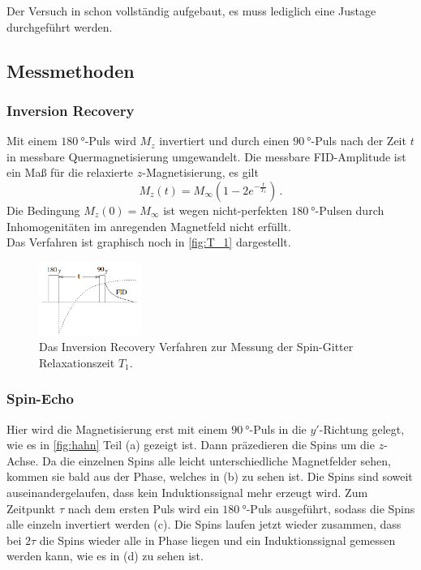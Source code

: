         \noindent Der Versuch in schon vollständig aufgebaut, es muss lediglich eine Justage durchgeführt werden. 

    \subsection{Messmethoden}
    \label{sec:Messmethoden}

    \subsubsection{Inversion Recovery}

        Mit einem $\SI{180}{\degree}$-Puls wird $M_z$ invertiert und durch einen $\SI{90}{\degree}$-Puls nach der Zeit $t$ 
        in messbare Quermagnetisierung umgewandelt. Die messbare FID-Amplitude ist ein Maß für die relaxierte $z$-Magnetisierung, es gilt 
        \begin{equation*}
            M_z(t) = M_\infty \left(1 - 2e^{-\frac{t}{T_1}}\right)\, .
        \end{equation*}
        Die Bedingung $M_z(0) = M_\infty$ ist wegen nicht-perfekten $\SI{180}{\degree}$-Pulsen durch Inhomogenitäten im anregenden Magnetfeld nicht erfüllt. \\
        Das Verfahren ist graphisch noch in \autoref{fig:T_1} dargestellt. 

        \begin{figure}%
            \centering%
            \includegraphics[width=0.3\textwidth]{latex/images/t_1_messung.png}%
            \caption{Das Inversion Recovery Verfahren zur Messung der Spin-Gitter Relaxationszeit $T_1$. \cite{grundlagen}}%
            \label{fig:T_1}%
        \end{figure}%

    \subsubsection{Spin-Echo}

        \noindent Hier wird die Magnetisierung erst mit einem $\SI{90}{\degree}$-Puls in die $y'$-Richtung gelegt, wie es in \autoref{fig:hahn} Teil (a) gezeigt ist. Dann präzedieren die Spins 
        um die $z$-Achse. Da die einzelnen Spins alle leicht unterschiedliche Magnetfelder sehen, kommen sie bald aus der Phase, welches in (b) zu sehen ist. Die Spins sind soweit auseinandergelaufen, 
        dass kein Induktionssignal mehr erzeugt wird. Zum Zeitpunkt $\tau$ nach dem ersten Puls wird ein $\SI{180}{\degree}$-Puls ausgeführt, sodass die Spins alle einzeln invertiert werden (c). 
        Die Spins laufen jetzt wieder zusammen, dass bei $2 \tau$ die Spins wieder alle in Phase liegen und ein Induktionssignal gemessen werden kann, wie es in (d) zu sehen ist.  

